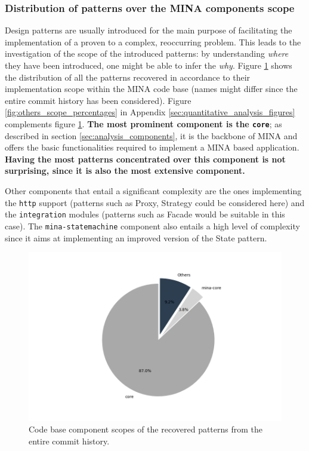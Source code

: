 \subsubsection{Distribution of patterns over the MINA components scope}
\label{sec:scope_analysis}
Design patterns are usually introduced for the main purpose of facilitating the implementation of a proven to a complex, reoccurring problem. This leads to the investigation of the scope of the introduced patterns: by understanding \textit{where} they have been introduced, one might be able to infer the \textit{why}. Figure \ref{fig:scope_percentages} shows the distribution of all the patterns recovered in accordance to their implementation scope within the MINA code base (names might differ since the entire commit history has been considered). Figure \ref{fig:others_scope_percentages} in Appendix \ref{sec:quantitative_analysis_figures} complements figure \ref{fig:scope_percentages}. \textbf{The most prominent component is the \texttt{core}}; as described in section \ref{sec:analysis_components}, it is the backbone of MINA and offers the basic functionalities required to implement a MINA based application. \textbf{Having the most patterns concentrated over this component is not surprising, since it is also the most extensive component.}

Other components that entail a significant complexity are the ones implementing the \texttt{http} support (patterns such as Proxy, Strategy could be considered here)  and the \texttt{integration} modules (patterns such as Facade would be suitable in this case). The \texttt{mina-statemachine} component also entails a high level of complexity since it aims at implementing an improved version of the State pattern.

\begin{figure}[H]
    \centering
    \includegraphics[width =\textwidth]{images/graphs/all_scopes_per.png}
    \caption{Code base component scopes of the recovered patterns from the entire commit history.}
    \label{fig:scope_percentages}
\end{figure}

